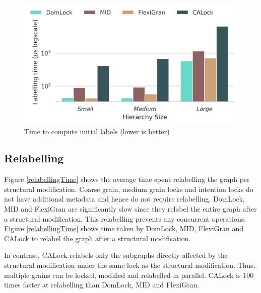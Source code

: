 \begin{figure}
	\centering
	\captionsetup{justification=centering}
	\includegraphics[width=.7\columnwidth]{figures/PerformanceCharts/InitialLabelling}
	\caption{Time to compute initial labels (lower is better)}
	\label{initialLabelling}
\end{figure}


\subsection{Relabelling}
Figure \ref{relabellingTime} shows the average time spent relabelling the graph per structural modification. Coarse grain, medium grain locks and intention locks do not have additional metadata and hence do not require relabelling. 
DomLock, MID and FlexiGran are significantly slow since they relabel the entire graph after a structural modification. This relabelling prevents any concurrent operations. Figure \ref{relabellingTime} shows time taken by DomLock, MID, FlexiGran and CALock to relabel the graph after a structural modification.





In contrast, CALock relabels only the subgraphs directly affected by the structural modification under the same lock as the structural modification.
Thus, multiple grains can be locked, modified and relabelled in parallel. CALock is 100 times faster at relabelling than DomLock, MID and FlexiGran.

